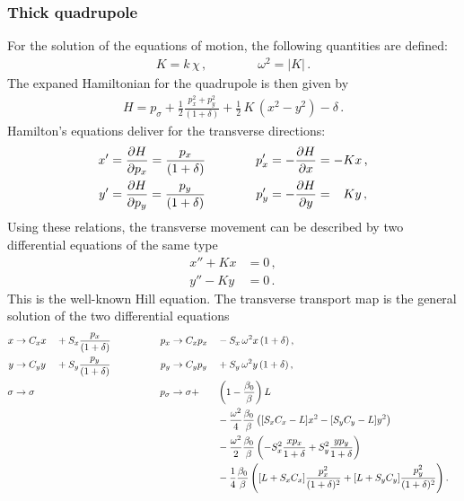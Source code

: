 \subsubsection{Thick quadrupole}
%
For the solution of the equations of motion, the following quantities are defined:
\begin{align}
K = k \, \chi \, ,\quad \quad \quad \quad  \omega^2 = |K| \, .
\end{align}
%
The expaned Hamiltonian for the quadrupole is then given by
\begin{align}
H = p_\sigma + \frac{1}{2} \frac{p_x^2+p_y^2}{(1+\delta)} + \frac{1}{2} \, K \, (x^2 -y^2) -\delta \, .
\end{align}
Hamilton's equations deliver for the transverse directions:
%
\begin{alignat}{4}
x' &= \frac{\partial H}{\partial p_x} = \frac{p_x}{(1+\delta)} \quad \quad \quad &p_x' &= - \frac{\partial H}{\partial x} = - K x \, ,  \\
y' &= \frac{\partial H}{\partial p_y} = \frac{p_y}{(1+\delta)} \quad \quad \quad &p_y' &= - \frac{\partial H}{\partial y} = \phantom{-} K y \, , 
\end{alignat}
Using these relations, the transverse movement can be described by two differential equations of the same type
\begin{align}
x'' + K x &= 0 \, , \label{eq:quadeq1} \\
y'' - K y &= 0 \, .
\end{align}
%
This is the well-known Hill equation. The transverse transport map is the general solution of the two differential equations 
\begin{alignat}{8}
x &\rightarrow C_x x &&+ S_x \frac{p_x}{(1+\delta)} \quad \quad \quad \quad &p_x &\rightarrow C_x p_x &&-  S_x \, \omega^2 x \, (1+\delta) \, , \\ 
y &\rightarrow C_y y &&+ S_y \frac{p_y}{(1+\delta)} \, &p_y &\rightarrow C_y p_y &&+  S_y \, \omega^2 y  \, (1+\delta) \, ,  \\
\sigma & \rightarrow \sigma && &p_\sigma &\rightarrow \sigma + &&\left( 1 - \frac{\beta_0}{\beta} \right) L  \, & \\
 & && & & &&-\frac{\omega^2}{4} \frac{\beta_0}{\beta} \left( [S_x C_x -L] x^2 - [S_y C_y -L] y^2 \right) \notag \\
  & && & & &&-\frac{\omega^2}{2} \frac{\beta_0}{\beta} \left( -S_x^2 \frac{x p_x}{1+\delta} +S_y^2 \frac{y p_y}{1+\delta} \right) \notag \\
 & && & & &&-\frac{1}{4} \frac{\beta_0}{\beta} \left( [L+S_xC_x] \frac{p_x^2}{(1+\delta)^2} + [L+S_yC_y] \frac{p_y^2}{(1+\delta)^2} \right) . \notag
\end{alignat}
